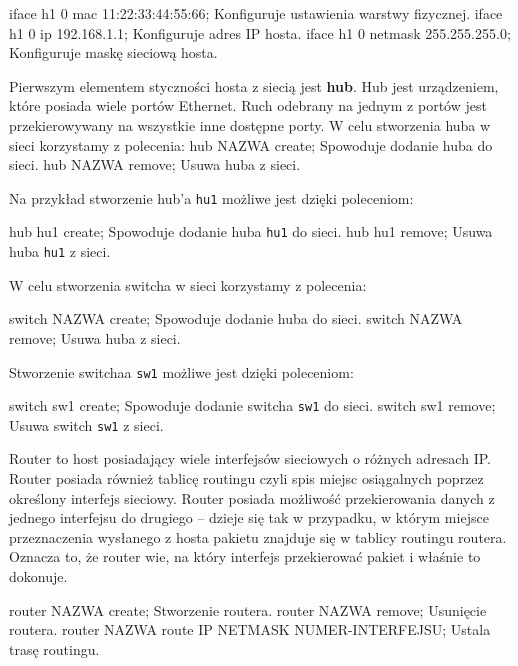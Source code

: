 \medskip
\mytt iface h1 0 mac 11:22:33:44:55:66; Konfiguruje ustawienia warstwy fizycznej.
\mytt iface h1 0 ip 192.168.1.1; Konfiguruje adres IP hosta.
\mytt iface h1 0 netmask 255.255.255.0; Konfiguruje maskę sieciową hosta.
\medskip

\noindent
Pierwszym elementem styczności hosta z siecią jest {\bf hub}. Hub jest
urządzeniem, które posiada wiele portów Ethernet. Ruch odebrany na jednym z
portów jest przekierowywany na wszystkie inne dostępne porty.  W celu
stworzenia huba w sieci korzystamy z polecenia:
\medskip
\mytt hub NAZWA create; Spowoduje dodanie huba do sieci.
\mytt hub NAZWA remove; Usuwa huba z sieci.
\medskip

\noindent
Na przykład stworzenie hub'a {\tt hu1} możliwe jest dzięki poleceniom:

\medskip
\mytt hub hu1 create; Spowoduje dodanie huba {\tt hu1} do sieci.
\mytt hub hu1 remove; Usuwa huba {\tt hu1} z sieci.
\medskip


\noindent
W celu stworzenia switcha w sieci korzystamy z polecenia:

\medskip
\mytt switch NAZWA create; Spowoduje dodanie huba do sieci.
\mytt switch NAZWA remove; Usuwa huba z sieci.
\medskip

\noindent
Stworzenie switchaa {\tt sw1} możliwe jest dzięki poleceniom:

\medskip
\mytt switch sw1 create; Spowoduje dodanie switcha {\tt sw1} do sieci.
\mytt switch sw1 remove; Usuwa switch {\tt sw1} z sieci.
\medskip

\noindent
Router to host posiadający wiele interfejsów sieciowych o różnych adresach
IP. Router posiada również tablicę routingu czyli spis miejsc osiągalnych
poprzez określony interfejs sieciowy.  Router posiada możliwość
przekierowania danych z jednego interfejsu do drugiego -- dzieje się tak w
przypadku, w którym miejsce przeznaczenia wysłanego z hosta pakietu znajduje
się w tablicy routingu routera.  Oznacza to, że router wie, na który
interfejs przekierować pakiet i właśnie to dokonuje.

\mytt router NAZWA create; Stworzenie routera.
\mytt router NAZWA remove; Usunięcie routera.
\mytt router NAZWA route IP NETMASK NUMER-INTERFEJSU; Ustala trasę routingu.

\smallskip
{}
\smallskip

